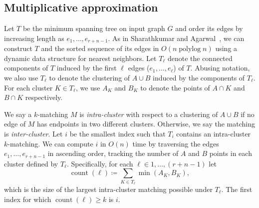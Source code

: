 \documentclass[a4paper,UKenglish]{socg-lipics-v2018}
\def\polylog{\mathop{\mathrm{polylog}}}
\def\eps{\varepsilon}
\def\cost{\operatorname{cost}}
\def\intracount{\operatorname{count}}
\theoremstyle{plain}
\numberwithin{figure}{section}
\def\EMPH#1{\textcolor{BrickRed}{{\emph{#1}}}}
\begin{document}


\begin{toappendix}
\subsection{Multiplicative approximation}
\label{SSA:multiplicative-approx}

Let $T$ be the minimum spanning tree on input graph $G$ and order
its edges by increasing length as $e_1, \ldots, e_{r+n-1}$.
As in Sharathkumar and Agarwal~\cite{SA12}, we can construct $T$ and the
sorted sequence of its edges in $O(n\polylog n)$ using a dynamic data structure
for nearest neighbors.
Let $T_\ell$ denote the connected components of $T$ induced by the first $\ell$
edges ($e_1, \ldots, e_{\ell}$) of $T$.
Abusing notation, we also use $T_\ell$ to denote the clustering of $A \cup B$
induced by the components of $T_\ell$.
For each cluster $K \in T_\ell$, we use $A_K$ and $B_K$ to denote the points of
$A \cap K$ and $B \cap K$ respectively.

We say a $k$-matching $M$ is \EMPH{intra-cluster} with respect to a clustering
of $A \cup B$ if no edge of $M$ has endpoints in two different clusters.
Otherwise, we say the matching is \EMPH{inter-cluster}.
Let $i$ be the smallest index such that $T_i$ contains an intra-cluster
$k$-matching.
We can compute $i$ in $O(n)$ time by traversing the edges
$e_1,\ldots ,e_{r+n-1}$ in ascending order, tracking the number of $A$ and $B$
points in each cluster defined by $T_\ell$.
Specifically, for each $\ell \in 1, \ldots, (r+n-1)$ let
\[
	\intracount(\ell) \coloneqq \sum_{K \in T_\ell} \min(A_K, B_K),
\]
which is the size of the largest intra-cluster matching possible under $T_\ell$.
The first index for which $\intracount(\ell) \geq k$ is $i$.


\end{toappendix}
\end{document}
